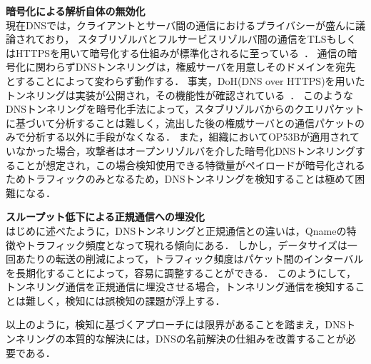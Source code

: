 \hspace{-12pt}\textbf{暗号化による解析自体の無効化}\\
\hspace{12pt}現在DNSでは，クライアントとサーバ間の通信におけるプライバシーが盛んに議論されており，
スタブリゾルバとフルサービスリゾルバ間の通信をTLSもしくはHTTPSを用いて暗号化する仕組みが標準化されるに至っている~\cite{rfc8094, rfc8484}．
通信の暗号化に関わらずDNSトンネリングは，権威サーバを用意しそのドメインを宛先とすることによって変わらず動作する．
事実，DoH(DNS over HTTPS)を用いたトンネリングは実装が公開され，その機能性が確認されている~\cite{dohtunnel, godoh, dohc2}．
このようなDNSトンネリングを暗号化手法によって，スタブリゾルバからのクエリパケットに基づいて分析することは難しく，流出した後の権威サーバとの通信パケットのみで分析する以外に手段がなくなる．
また，組織においてOP53Bが適用されていなかった場合，攻撃者はオープンリゾルバを介した暗号化DNSトンネリングすることが想定され，この場合検知使用できる特徴量がペイロードが暗号化されるためトラフィックのみとなるため，DNSトンネリングを検知することは極めて困難になる．\newline

\hspace{-12pt}\textbf{スループット低下による正規通信への埋没化}\\
\hspace{12pt}はじめに述べたように，DNSトンネリングと正規通信との違いは，Qnameの特徴やトラフィック頻度となって現れる傾向にある．
しかし，データサイズは一回あたりの転送の削減によって，トラフィック頻度はパケット間のインターバルを長期化することによって，容易に調整することができる．
このようにして，トンネリング通信を正規通信に埋没させる場合，トンネリング通信を検知することは難しく，検知には誤検知の課題が浮上する．

以上のように，検知に基づくアプローチには限界があることを踏まえ，DNSトンネリングの本質的な解決には，DNSの名前解決の仕組みを改善することが必要である．

